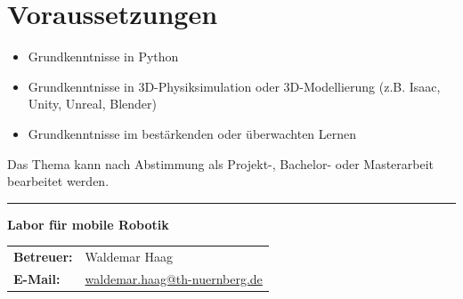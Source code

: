 \documentclass[a4paper,11pt]{article}
\begin{document}
\section*{Voraussetzungen}
\begin{itemize}[leftmargin=0.5cm]
    \item Grundkenntnisse in Python
    \item Grundkenntnisse in 3D-Physiksimulation oder 3D-Modellierung (z.B. Isaac, Unity, Unreal, Blender)
    \item Grundkenntnisse im bestärkenden oder überwachten Lernen
\end{itemize}

\vspace{0.5cm}
Das Thema kann nach Abstimmung als Projekt-, Bachelor- oder Masterarbeit bearbeitet werden. 


\vfill
\textcolor{ohm_red}{\rule{\linewidth}{0.4mm}}
\textbf{\textcolor{ohm_red}{Labor für mobile Robotik}} \\
\begin{tabular}{@{}ll}
\textbf{Betreuer:} & Waldemar Haag \\
\textbf{E-Mail:}   & \href{mailto:waldemar.haag@th-nuernberg.de}{waldemar.haag@th-nuernberg.de} \\
\end{tabular}
\end{document}
